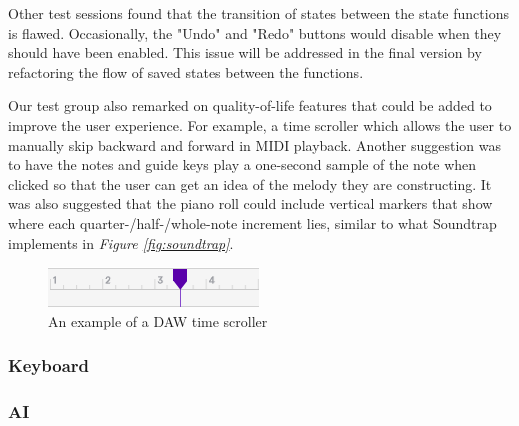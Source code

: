 Other test sessions found that the transition of states between the state functions is flawed.
Occasionally, the "Undo" and "Redo" buttons would disable when they should have been enabled. This
issue will be addressed in the final version by refactoring the flow of saved states between the
functions.

Our test group also remarked on quality-of-life features that could be added to improve the user
experience. For example, a time scroller which allows the user to manually skip backward and
forward in MIDI playback. Another suggestion was to have the notes and guide keys play a
one-second sample of the note when clicked so that the user can get an idea of the melody they
are constructing. It was also suggested that the piano roll could include vertical markers that
show where each quarter-/half-/whole-note increment lies, similar to what Soundtrap implements in
\textit{Figure \ref{fig:soundtrap}}.

\begin{figure}[h!]
  \centering
  \includegraphics{image/Scroller.png}
  \caption{An example of a DAW time scroller}
  \label{fig:scroller}
\end{figure}

\subsubsection{Keyboard}

\blindtext

\subsubsection{AI}

\blindtext
